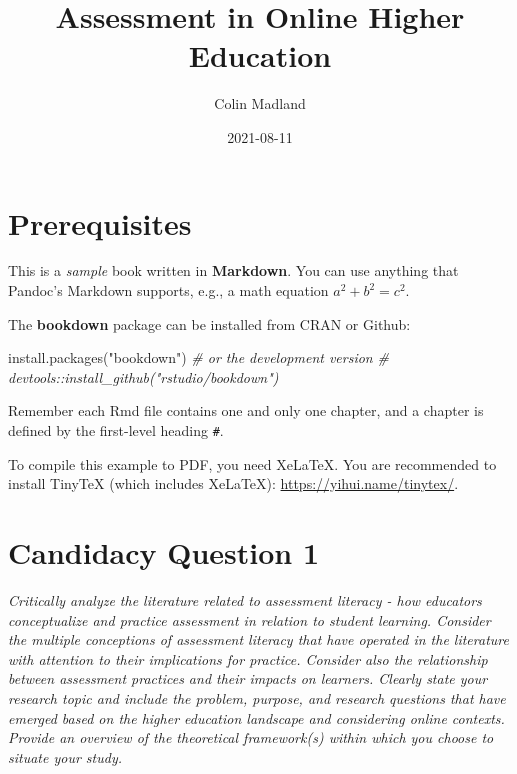 \documentclass[
]{book}
\title{Assessment in Online Higher Education}
\author{Colin Madland}
\date{2021-08-11}
\newenvironment{Shaded}{\begin{snugshade}}{\end{snugshade}}
\newcommand{\CommentTok}[1]{\textcolor[rgb]{0.56,0.35,0.01}{\textit{#1}}}
\newcommand{\FunctionTok}[1]{\textcolor[rgb]{0.00,0.00,0.00}{#1}}
\newcommand{\NormalTok}[1]{#1}
\newcommand{\StringTok}[1]{\textcolor[rgb]{0.31,0.60,0.02}{#1}}
\begin{document}
\maketitle

{
\setcounter{tocdepth}{1}
\tableofcontents
}
\hypertarget{prerequisites}{%
\chapter{Prerequisites}\label{prerequisites}}

This is a \emph{sample} book written in \textbf{Markdown}. You can use anything that Pandoc's Markdown supports, e.g., a math equation \(a^2 + b^2 = c^2\).

The \textbf{bookdown} package can be installed from CRAN or Github:

\begin{Shaded}
\begin{Highlighting}[]
\FunctionTok{install.packages}\NormalTok{(}\StringTok{"bookdown"}\NormalTok{)}
\CommentTok{\# or the development version}
\CommentTok{\# devtools::install\_github("rstudio/bookdown")}
\end{Highlighting}
\end{Shaded}

Remember each Rmd file contains one and only one chapter, and a chapter is defined by the first-level heading \texttt{\#}.

To compile this example to PDF, you need XeLaTeX. You are recommended to install TinyTeX (which includes XeLaTeX): \url{https://yihui.name/tinytex/}.

\hypertarget{candidacy-question-1}{%
\chapter{Candidacy Question 1}\label{candidacy-question-1}}

\emph{Critically analyze the literature related to assessment literacy - how educators conceptualize and practice assessment in relation to student learning. Consider the multiple conceptions of assessment literacy that have operated in the literature with attention to their implications for practice. Consider also the relationship between assessment practices and their impacts on learners. Clearly state your research topic and include the problem, purpose, and research questions that have emerged based on the higher education landscape and considering online contexts. Provide an overview of the theoretical framework(s) within which you choose to situate your study.}
\end{document}
